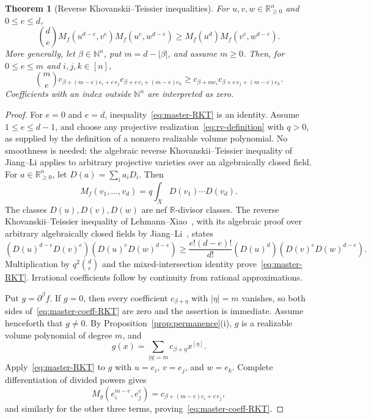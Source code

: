 \documentclass[11pt,a4paper,oneside]{amsart}
\numberwithin{equation}{section}
\newtheorem{theorem}{Theorem}[section]
\theoremstyle{definition}
\theoremstyle{remark}
\newcommand{\N}{\mathbb N}
\newcommand{\R}{\mathbb R}
\newcommand{\abs}[1]{\lvert#1\rvert}
\begin{document}
\begin{theorem}[Reverse Khovanskii--Teissier inequalities]\label{thm:master-RKT}
For $u,v,w\in\R_{\geq0}^n$ and $0\leq e\leq d$,
\begin{equation}\label{eq:master-RKT}
 \binom de
 M_f(u^{d-e},v^e)M_f(u^e,w^{d-e})
 \geq
 M_f(u^d)M_f(v^e,w^{d-e}).
\end{equation}
More generally, let $\beta\in\N^n$, put $m=d-\abs\beta$, and assume $m\geq0$.  Then, for $0\leq e\leq m$ and $i,j,k\in[n]$,
\begin{equation}\label{eq:master-coeff-RKT}
 \binom me
 c_{\beta+(m-e)e_i+e\,e_j}
 c_{\beta+e\,e_i+(m-e)e_k}
 \geq
 c_{\beta+m e_i}
 c_{\beta+e\,e_j+(m-e)e_k}.
\end{equation}
Coefficients with an index outside $\N^n$ are interpreted as zero.
\end{theorem}

\begin{proof}
For $e=0$ and $e=d$, inequality~\eqref{eq:master-RKT} is an identity.  Assume $1\leq e\leq d-1$, and choose any projective realization~\eqref{eq:rv-definition} with $q>0$, as supplied by the definition of a nonzero realizable volume polynomial.  No smoothness is needed: the algebraic reverse Khovanskii--Teissier inequality of Jiang--Li applies to arbitrary projective varieties over an algebraically closed field.  For $a\in\R_{\geq0}^n$, let $D(a)=\sum_i a_iD_i$.  Then
\[
 M_f(v_1,\ldots,v_d)=q\int_X D(v_1)\cdots D(v_d).
\]
The classes $D(u),D(v),D(w)$ are nef $\R$-divisor classes.  The reverse Khovanskii--Teissier inequality of Lehmann--Xiao~\cite[Theorem~5.7]{LehmannXiao17}, with its algebraic proof over arbitrary algebraically closed fields by Jiang--Li~\cite[Theorem~1.1]{JiangLi23}, states
\[
 \left( D(u)^{d-e}D(v)^e\right)
 \left( D(u)^eD(w)^{d-e}\right)
 \geq
 \frac{e!(d-e)!}{d!}
 \left(D(u)^d\right)
 \left(D(v)^eD(w)^{d-e}\right).
\]
Multiplication by $q^2\binom de$ and the mixed-intersection identity prove~\eqref{eq:master-RKT}.  Irrational coefficients follow by continuity from rational approximations.

Put $g=\partial^\beta f$.  If $g=0$, then every coefficient $c_{\beta+\eta}$ with $|\eta|=m$ vanishes, so both sides of~\eqref{eq:master-coeff-RKT} are zero and the assertion is immediate.  Assume henceforth that $g\neq0$.  By Proposition~\ref{prop:permanence}(i), $g$ is a realizable volume polynomial of degree $m$, and
\[
 g(x)=\sum_{\abs\eta=m}c_{\beta+\eta}x^{[\eta]}.
\]
Apply~\eqref{eq:master-RKT} to $g$ with $u=e_i$, $v=e_j$, and $w=e_k$.  Complete differentiation of divided powers gives
\[
 M_g(e_i^{m-e},e_j^e)=c_{\beta+(m-e)e_i+e\,e_j},
\]
and similarly for the other three terms, proving~\eqref{eq:master-coeff-RKT}.
\end{proof}
\end{document}
